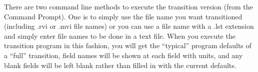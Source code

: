 There are two command line methods to execute the transition version (from the Command Prompt). One is to simply use the file name you want transitioned (including .rvi or .mvi file names) or you can use a file name with a .lst extension and simply enter file names to be done in a text file. When you execute the transition program in this fashion, you will get the ``typical'' program defaults of a ``full'' transition, field names will be shown at each field with units, and any blank fields will be left blank rather than filled in with the current defaults.
